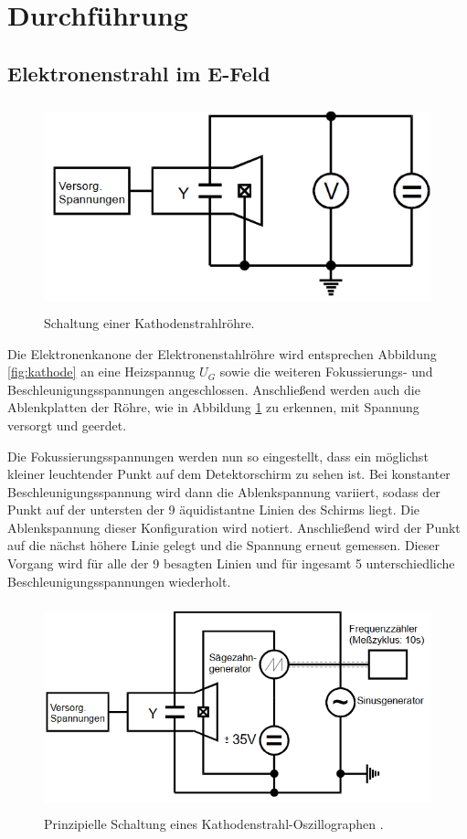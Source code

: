 \section{Durchführung}
\label{sec:Durchführung}

\subsection{Elektronenstrahl im E-Feld}
\begin{figure}[H]
  \centering
  \includegraphics[height=6cm]{Elektronenstrahlroehre_Schaltung.PNG}
  \caption{Schaltung einer Kathodenstrahlröhre. \cite{sample}}
  \label{fig:Schaltung}
\end{figure}

Die Elektronenkanone der Elektronenstahlröhre wird entsprechen Abbildung \ref{fig:kathode}
an eine Heizspannug $U_G$ sowie die weiteren Fokussierungs- und Beschleunigungsspannungen angeschlossen.
Anschließend werden auch die Ablenkplatten der Röhre, wie in Abbildung \ref{fig:Schaltung} zu erkennen, mit Spannung
versorgt und geerdet.

Die Fokussierungsspannungen werden nun so eingestellt, dass ein möglichst kleiner leuchtender Punkt auf dem
Detektorschirm zu sehen ist. Bei konstanter Beschleunigungsspannung wird dann die Ablenkspannung variiert, sodass
der Punkt auf der untersten der 9 äquidistantne Linien des Schirms liegt. Die Ablenkspannung dieser Konfiguration wird
notiert. Anschließend wird der Punkt auf die nächst höhere Linie gelegt und die Spannung erneut gemessen.
Dieser Vorgang wird für alle der 9 besagten Linien und für ingesamt 5 unterschiedliche Beschleunigungsspannungen wiederholt.

\begin{figure}[H]
  \centering
  \includegraphics[height=6cm]{Oszilloskop_Schaltung.PNG}
  \caption{Prinzipielle Schaltung eines Kathodenstrahl-Oszillographen . \cite{sample}}
  \label{fig:Schaltung1}
\end{figure}


